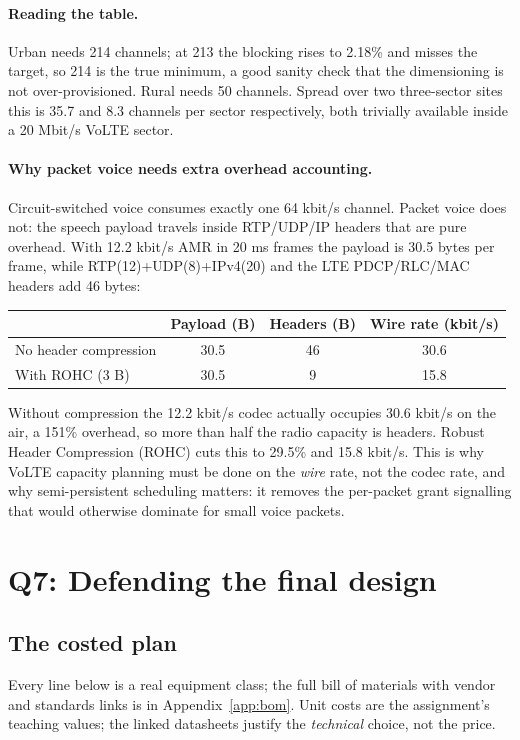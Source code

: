 \documentclass[9pt,a4paper]{article}
\begin{document}
\paragraph{Reading the table.} Urban needs 214 channels; at 213 the blocking rises to 2.18\% and
misses the target, so 214 is the true minimum, a good sanity check that the dimensioning is not
over-provisioned. Rural needs 50 channels. Spread over two three-sector sites this is 35.7 and 8.3
channels per sector respectively, both trivially available inside a 20 Mbit/s VoLTE sector.

\paragraph{Why packet voice needs extra overhead accounting.} Circuit-switched voice consumes
exactly one 64 kbit/s channel. Packet voice does not: the speech payload travels inside
RTP/UDP/IP headers that are pure overhead. With 12.2 kbit/s AMR in 20 ms frames the payload is
30.5 bytes per frame, while RTP(12)+UDP(8)+IPv4(20) and the LTE PDCP/RLC/MAC headers add 46
bytes:

\begin{center}\small
\begin{tabular}{@{}lccc@{}}
\toprule
& Payload (B) & Headers (B) & Wire rate (kbit/s) \\
\midrule
No header compression & 30.5 & 46 & 30.6 \\
With ROHC (3 B) & 30.5 & 9 & 15.8 \\
\bottomrule
\end{tabular}
\end{center}

Without compression the 12.2 kbit/s codec actually occupies 30.6 kbit/s on the air, a 151\%
overhead, so more than half the radio capacity is headers. Robust Header Compression (ROHC) cuts
this to 29.5\% and 15.8 kbit/s. This is why VoLTE capacity planning must be done on the \emph{wire}
rate, not the codec rate, and why semi-persistent scheduling matters: it removes the per-packet
grant signalling that would otherwise dominate for small voice packets.

\section{Q7: Defending the final design}
\label{sec:q7}

\subsection{The costed plan}
Every line below is a real equipment class; the full bill of materials with vendor and standards
links is in Appendix~\ref{app:bom}. Unit costs are the assignment's teaching values; the linked
datasheets justify the \emph{technical} choice, not the price.
\end{document}
